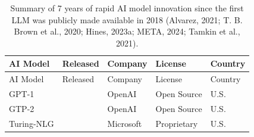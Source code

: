 \documentclass[
  letterpaper,
  DIV=11,
  numbers=noendperiod]{scrartcl}
\begin{document}
\begin{longtable}[]{@{}
  >{\raggedright\arraybackslash}p{}
  >{\raggedright\arraybackslash}p{}
  >{\raggedright\arraybackslash}p{}
  >{\raggedright\arraybackslash}p{}
  >{\raggedright\arraybackslash}p{}@{}}
\caption{Summary of 7 years of rapid AI model innovation since the first
LLM was publicly made available in 2018 (Alvarez, 2021; T. B. Brown et
al., 2020; Hines, 2023a; META, 2024; Tamkin et al.,
2021).}\tabularnewline
\toprule\noalign{}
\begin{minipage}[b]{\linewidth}\raggedright
AI Model
\end{minipage} & \begin{minipage}[b]{\linewidth}\raggedright
Released
\end{minipage} & \begin{minipage}[b]{\linewidth}\raggedright
Company
\end{minipage} & \begin{minipage}[b]{\linewidth}\raggedright
License
\end{minipage} & \begin{minipage}[b]{\linewidth}\raggedright
Country
\end{minipage} \\
\midrule\noalign{}
\endfirsthead
\toprule\noalign{}
\begin{minipage}[b]{\linewidth}\raggedright
AI Model
\end{minipage} & \begin{minipage}[b]{\linewidth}\raggedright
Released
\end{minipage} & \begin{minipage}[b]{\linewidth}\raggedright
Company
\end{minipage} & \begin{minipage}[b]{\linewidth}\raggedright
License
\end{minipage} & \begin{minipage}[b]{\linewidth}\raggedright
Country
\end{minipage} \\
\midrule\noalign{}
\endhead
\bottomrule\noalign{}
\endlastfoot
GPT-1 & 2018 & OpenAI & Open Source & U.S. \\
GTP-2 & 2019 & OpenAI & Open Source & U.S. \\
Turing-NLG & 2020 & Microsoft & Proprietary & U.S. \\

\end{longtable}
\end{document}
